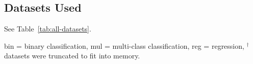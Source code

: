 \documentclass[sigconf,screen]{acmart}
\begin{document}
\subsection{Datasets Used}

See Table~\ref{tab:all-datasets}.

\begin{table}[t]
\centering
\caption{Datasets used, by source. Categorical columns are ordinally encoded over their alphabetically sorted values. NaNs are column mean imputed. Multi-class classification problems was converted to 1-vs-all binary on the majority class. Eight datasets appear in both CC18 and TabArena. }
\footnotesize
\setlength{\tabcolsep}{4pt}
bin = binary classification, mul = multi-class classification, reg = regression, $^\dagger$ datasets were truncated to fit into memory.
\label{tab:all-datasets}


\end{table}
\end{document}
